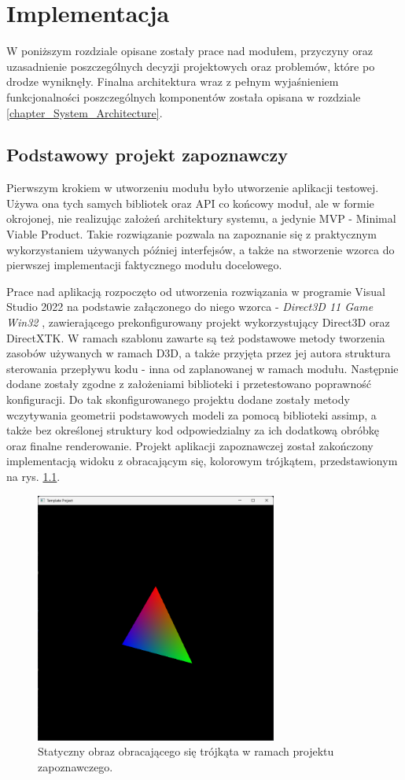 \chapter{Implementacja}
W poniższym rozdziale opisane zostały prace nad modułem, przyczyny oraz uzasadnienie poszczególnych decyzji projektowych oraz problemów, które po drodze wyniknęły. Finalna architektura wraz z pełnym wyjaśnieniem funkcjonalności poszczególnych komponentów została opisana w rozdziale \ref{chapter_System_Architecture}.

\section{Podstawowy projekt zapoznawczy}
Pierwszym krokiem w utworzeniu modułu było utworzenie aplikacji testowej. Używa ona tych samych bibliotek oraz API co końcowy moduł, ale w formie okrojonej, nie realizując założeń architektury systemu, a jedynie MVP - Minimal Viable Product. Takie rozwiązanie pozwala na zapoznanie się z praktycznym wykorzystaniem używanych później interfejsów, a także na stworzenie wzorca do pierwszej implementacji faktycznego modułu docelowego.

Prace nad aplikacją rozpoczęto od utworzenia rozwiązania w programie Visual Studio 2022 na podstawie załączonego do niego wzorca - \textit{Direct3D 11 Game Win32} \cite{GitHub:walbourn:directx-vs-templates}, zawierającego prekonfigurowany projekt wykorzystujący Direct3D oraz DirectXTK. W ramach szablonu zawarte są też podstawowe metody tworzenia zasobów używanych w ramach D3D, a także przyjęta przez jej autora struktura sterowania przepływu kodu - inna od zaplanowanej w ramach modułu. Następnie dodane zostały zgodne z założeniami biblioteki i przetestowano poprawność konfiguracji. Do tak skonfigurowanego projektu dodane zostały metody wczytywania geometrii podstawowych modeli za pomocą biblioteki assimp, a także bez określonej struktury kod odpowiedzialny za ich dodatkową obróbkę oraz finalne renderowanie. Projekt aplikacji zapoznawczej został zakończony implementacją widoku z obracającym się, kolorowym trójkątem, przedstawionym na rys. \ref{Impl_TemplateProject}.

\begin{figure}[h!]
	\centering
	\includegraphics[width=300px]{images/impl/1_template_project.png}
	\caption{Statyczny obraz obracającego się trójkąta w ramach projektu zapoznawczego.}
	\label{Impl_TemplateProject}
\end{figure}

